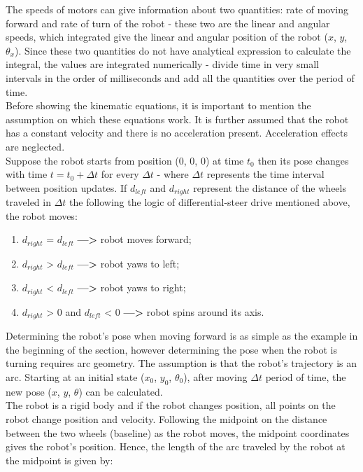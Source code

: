 The speeds of motors can give information about two quantities: rate of moving forward and rate of turn of the robot - these two are the linear and angular speeds, which integrated give the linear and angular position of the robot ($x$, $y$, $\theta_x$). Since these two quantities do not have analytical expression to calculate the integral, the values are integrated numerically - divide time in very small intervals in the order of milliseconds and add all the quantities over the period of time. \cite{mit} \\

Before showing the kinematic equations, it is important to mention the assumption on which these equations work. It is further assumed that the robot has a constant velocity and there is no acceleration present. Acceleration effects are neglected. \cite{robotics}\\

Suppose the robot starts from position (0, 0, 0) at time $t_0$ then its pose changes with time $t = t_0 + \Delta t$ for every $\Delta t$ - where $\Delta t$ represents the time interval between position updates. If $d_{left}$ and $d_{right}$ represent the distance of the wheels traveled in $\Delta t$ the following the logic of differential-steer drive mentioned above, the robot moves:

\begin{enumerate}
    \item $d_{right}$ = $d_{left}$\textbf{ ---> }robot moves forward;
    \item $d_{right}$ > $d_{left}$\textbf{ ---> }robot yaws to left;
    \item $d_{right}$ < $d_{left}$\textbf{ ---> }robot yaws to right;
    \item $d_{right}$ > 0 and  $d_{left}$ < 0\textbf{ ---> }robot spins around its axis.
\end{enumerate}

Determining the robot's pose when moving forward is as simple as the example in the beginning of the section, however determining the pose when the robot is turning requires arc geometry. The assumption is that the robot's trajectory is an arc. Starting at an initial state ($x_0$, $y_0$, $\theta_0$), after moving $\Delta t$ period of time, the new pose ($x$, $y$, $\theta$) can be calculated.\\

The robot is a rigid body and if the robot changes position, all points on the robot change position and velocity. Following the midpoint on the distance between the two wheels (baseline) as the robot moves, the midpoint coordinates gives the robot's position. Hence, the length of the arc traveled by the robot at the midpoint is given by:

